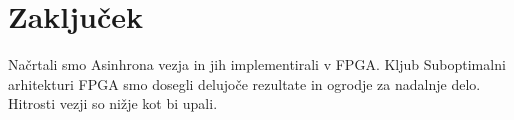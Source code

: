 \chapter{Zaključek} \label{zakljucek}

Načrtali smo Asinhrona vezja in jih implementirali v FPGA. Kljub Suboptimalni arhitekturi FPGA smo dosegli delujoče rezultate in ogrodje za nadalnje delo. Hitrosti vezji so nižje kot bi upali.
	

